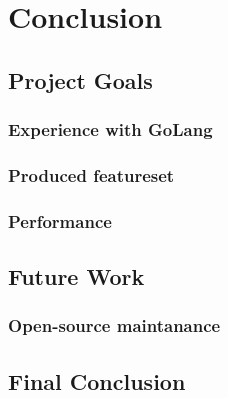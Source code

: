 \section{Conclusion}
\label{sec:Conclusion}

\subsection{Project Goals}
\label{sub:Project Goals}

\subsubsection{Experience with GoLang}
\label{subs:Experience with GoLang}

\subsubsection{Produced featureset}
\label{subs:Produced featureset}

\subsubsection{Performance}
\label{subs:Performance}

\subsection{Future Work}
\label{sub:Future Work}

\subsubsection{Open-source maintanance}
\label{subs:Open-source maintanance}

\subsection{Final Conclusion}
\label{sub:Final Conclusion}

